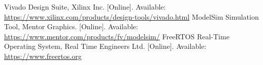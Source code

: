 \documentclass[conference]{IEEEtran}
\begin{document}
\begin{thebibliography}{00}
Vivado Design Suite, Xilinx Inc. [Online]. Available: \url{https://www.xilinx.com/products/design-tools/vivado.html}
ModelSim Simulation Tool, Mentor Graphics. [Online]. Available: \url{https://www.mentor.com/products/fv/modelsim/}
FreeRTOS Real-Time Operating System, Real Time Engineers Ltd. [Online]. Available: \url{https://www.freertos.org}

\end{thebibliography}
\end{document}
